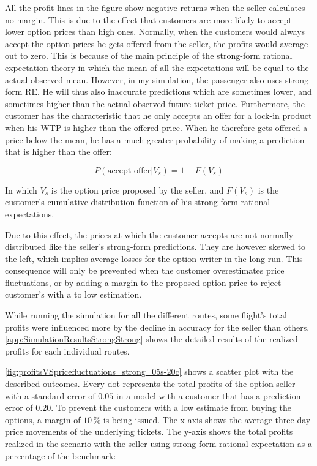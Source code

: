 All the profit lines in the figure show negative returns when the seller calculates no margin. This is due to the effect that customers are more likely to accept lower option prices than high ones. Normally, when the customers would always accept the option prices he gets offered from the seller, the profits would average out to zero. This is because of the main principle of the strong-form rational expectation theory in which the mean of all the expectations will be equal to the actual observed mean. However, in my simulation, the passenger also uses strong-form RE. He will thus also inaccurate predictions which are sometimes lower, and sometimes higher than the actual observed future ticket price. Furthermore, the customer has the characteristic that he only accepts an offer for a lock-in product when his WTP is higher than the offered price. When he therefore gets offered a price below the mean, he has a much greater probability of making a prediction that is higher than the offer:

$$ P(\mbox{accept offer} | V_s)  = 1 - F(V_s)  $$

In which $V_s$ is the option price proposed by the seller, and $F(V_s)$ is the customer's cumulative distribution function of his strong-form rational expectations.

Due to this effect, the prices at which the customer accepts are not normally distributed like the seller's strong-form predictions. They are however skewed to the left, which implies average losses for the option writer in the long run. This consequence will only be prevented when the customer overestimates price fluctuations, or by adding a margin to the proposed option price to reject customer's with a to low estimation.


While running the simulation for all the different routes, some flight's total profits were influenced more by the decline in accuracy for the seller than others. \autoref{app:SimulationResultsStrongStrong} shows the detailed results of the realized profits for each individual routes.

\autoref{fig:profitsVSpricefluctuations_strong_05s-20c} shows a scatter plot with the described outcomes. Every dot represents the total profits of the option seller with a standard error of $0.05$ in a model with a customer that has a prediction error of $0.20$. To prevent the customers with a low estimate from buying the options, a margin of $10\,\%$ is being issued. The x-axis shows the average three-day price movements of the underlying tickets. The y-axis shows the total profits realized in the scenario with the seller using strong-form rational expectation as a percentage of the benchmark:


